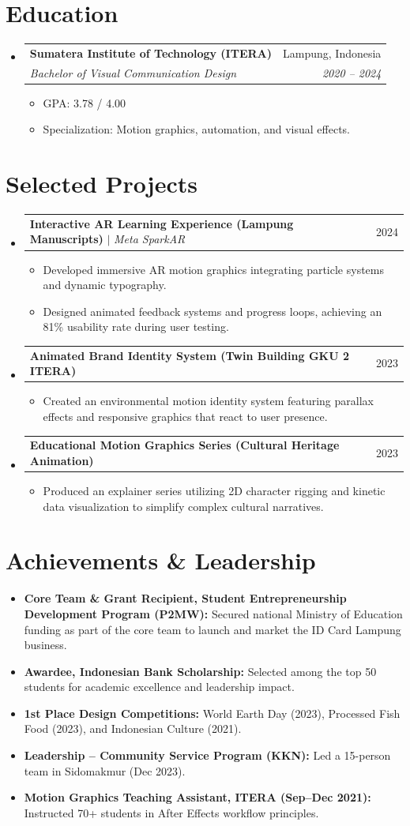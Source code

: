 \documentclass[letterpaper,11pt]{article}
\makeatletter
\newcommand{\resumeItem}[1]{
  \item\small{
    {#1 \vspace{-2pt}}
  }
}
\newcommand{\resumeSubheading}[4]{
  \vspace{-2pt}\item
    \begin{tabular*}{0.97\textwidth}[t]{l@{\extracolsep{\fill}}r}
      \textbf{#1} & #2 \\
      \textit{\small#3} & \textit{\small #4} \\
    \end{tabular*}\vspace{-7pt}
}
\newcommand{\resumeProjectHeading}[2]{
    \item
    \begin{tabular*}{0.97\textwidth}{l@{\extracolsep{\fill}}r}
      \small#1 & #2 \\
    \end{tabular*}\vspace{-7pt}
}
\newcommand{\resumeSubHeadingListStart}{\begin{itemize}[leftmargin=0.15in, label={}]}
\newcommand{\resumeSubHeadingListEnd}{\end{itemize}}
\newcommand{\resumeItemListStart}{\begin{itemize}}
\newcommand{\resumeItemListEnd}{\end{itemize}\vspace{-5pt}}
\makeatother
\begin{document}
\section{Education}
  \resumeSubHeadingListStart
    \resumeSubheading
      {Sumatera Institute of Technology (ITERA)}{Lampung, Indonesia}
      {Bachelor of Visual Communication Design}{2020 -- 2024}
      \resumeItemListStart
        \resumeItem{GPA: 3.78 / 4.00}
        \resumeItem{Specialization: Motion graphics, automation, and visual effects.}
      \resumeItemListEnd
  \resumeSubHeadingListEnd

\section{Selected Projects}
  \resumeSubHeadingListStart

    \resumeProjectHeading
      {\textbf{Interactive AR Learning Experience (Lampung Manuscripts)} $|$ \emph{Meta SparkAR}}{2024}
      \resumeItemListStart
        \resumeItem{Developed immersive AR motion graphics integrating particle systems and dynamic typography.}
        \resumeItem{Designed animated feedback systems and progress loops, achieving an 81\% usability rate during user testing.}
      \resumeItemListEnd

    \resumeProjectHeading
      {\textbf{Animated Brand Identity System (Twin Building GKU 2 ITERA)}}{2023}
      \resumeItemListStart
        \resumeItem{Created an environmental motion identity system featuring parallax effects and responsive graphics that react to user presence.}
      \resumeItemListEnd

    \resumeProjectHeading
      {\textbf{Educational Motion Graphics Series (Cultural Heritage Animation)}}{2023}
      \resumeItemListStart
        \resumeItem{Produced an explainer series utilizing 2D character rigging and kinetic data visualization to simplify complex cultural narratives.}
      \resumeItemListEnd

  \resumeSubHeadingListEnd

\section{Achievements \& Leadership}
  \resumeSubHeadingListStart
    \resumeItem{\textbf{Core Team \& Grant Recipient, Student Entrepreneurship Development Program (P2MW):} Secured national Ministry of Education funding as part of the core team to launch and market the ID Card Lampung business.}
    \resumeItem{\textbf{Awardee, Indonesian Bank Scholarship:} Selected among the top 50 students for academic excellence and leadership impact.}
    \resumeItem{\textbf{1st Place Design Competitions:} World Earth Day (2023), Processed Fish Food (2023), and Indonesian Culture (2021).}
    \resumeItem{\textbf{Leadership -- Community Service Program (KKN):} Led a 15-person team in Sidomakmur (Dec 2023).}
    \resumeItem{\textbf{Motion Graphics Teaching Assistant, ITERA (Sep--Dec 2021):} Instructed 70+ students in After Effects workflow principles.}
  \resumeSubHeadingListEnd

\end{document}

